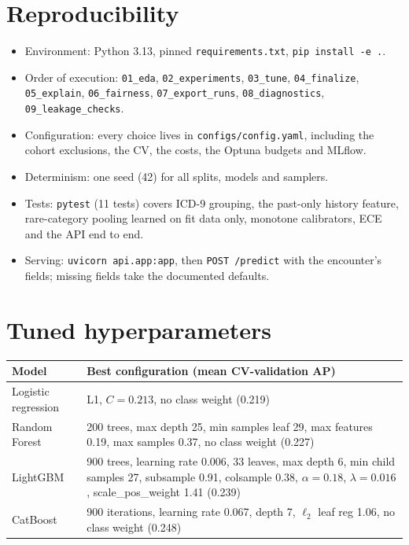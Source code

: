\documentclass[11pt,a4paper]{article}
\newcommand{\code}[1]{\texttt{\small #1}}
\begin{document}
\appendix
\section{Reproducibility}
\begin{itemize}
\item Environment: Python 3.13, pinned \code{requirements.txt}, \code{pip install -e .}.
\item Order of execution: \code{01\_eda}, \code{02\_experiments}, \code{03\_tune}, \code{04\_finalize}, \code{05\_explain}, \code{06\_fairness}, \code{07\_export\_runs}, \code{08\_diagnostics}, \code{09\_leakage\_checks}.
\item Configuration: every choice lives in \code{configs/config.yaml}, including the cohort exclusions, the CV, the costs, the Optuna budgets and MLflow.
\item Determinism: one seed (42) for all splits, models and samplers.
\item Tests: \code{pytest} (11 tests) covers ICD-9 grouping, the past-only history feature, rare-category pooling learned on fit data only, monotone calibrators, ECE and the API end to end.
\item Serving: \code{uvicorn api.app:app}, then \code{POST /predict} with the encounter's fields; missing fields take the documented defaults.
\end{itemize}

\section{Tuned hyperparameters}
\begin{table}[H]
\centering\small
\begin{tabular}{lp{12.5cm}}
\toprule
Model & Best configuration (mean CV-validation AP) \\
\midrule
Logistic regression & L1, $C=0.213$, no class weight (0.219) \\
Random Forest & 200 trees, max depth 25, min samples leaf 29, max features 0.19, max samples 0.37, no class weight (0.227) \\
LightGBM & 900 trees, learning rate 0.006, 33 leaves, max depth 6, min child samples 27, subsample 0.91, colsample 0.38, $\alpha=0.18$, $\lambda=0.016$, scale\_pos\_weight 1.41 (0.239) \\
CatBoost & 900 iterations, learning rate 0.067, depth 7, $\ell_2$ leaf reg 1.06, no class weight (0.248) \\
\bottomrule
\end{tabular}
\end{table}
\end{document}
